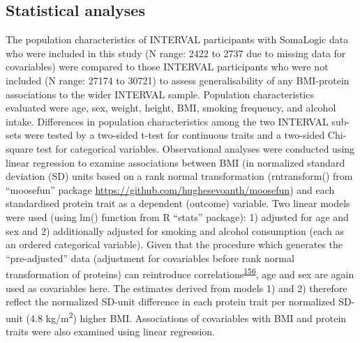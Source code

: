 \documentclass[11pt,twoside]{bristolthesis}
\begin{document}
\hypertarget{statistical-analyses}{%
\subsection{Statistical analyses}\label{statistical-analyses}}

The population characteristics of INTERVAL participants with SomaLogic data who were included in this study (N range: 2422 to 2737 due to missing data for covariables) were compared to those INTERVAL participants who were not included (N range: 27174 to 30721) to assess generalisability of any BMI-protein associations to the wider INTERVAL sample. Population characteristics evaluated were age, sex, weight, height, BMI, smoking frequency, and alcohol intake. Differences in population characteristics among the two INTERVAL sub-sets were tested by a two-sided t-test for continuous traits and a two-sided Chi-square test for categorical variables. Observational analyses were conducted using linear regression to examine associations between BMI (in normalized standard deviation (SD) units based on a rank normal transformation (rntransform() from ``moosefun'' package \url{https://github.com/hughesevoanth/moosefun}) and each standardised protein trait as a dependent (outcome) variable. Two linear models were used (using lm() function from R ``stats'' package): 1) adjusted for age and sex and 2) additionally adjusted for smoking and alcohol consumption (each as an ordered categorical variable). Given that the procedure which generates the ``pre-adjusted'' data (adjustment for covariables before rank normal transformation of proteins) can reintroduce correlations\textsuperscript{\protect\hyperlink{ref-Pain2018}{156}}, age and sex are again used as covariables here. The estimates derived from models 1) and 2) therefore reflect the normalized SD-unit difference in each protein trait per normalized SD-unit (4.8 kg/m\textsuperscript{2}) higher BMI. Associations of covariables with BMI and protein traits were also examined using linear regression.
\end{document}
